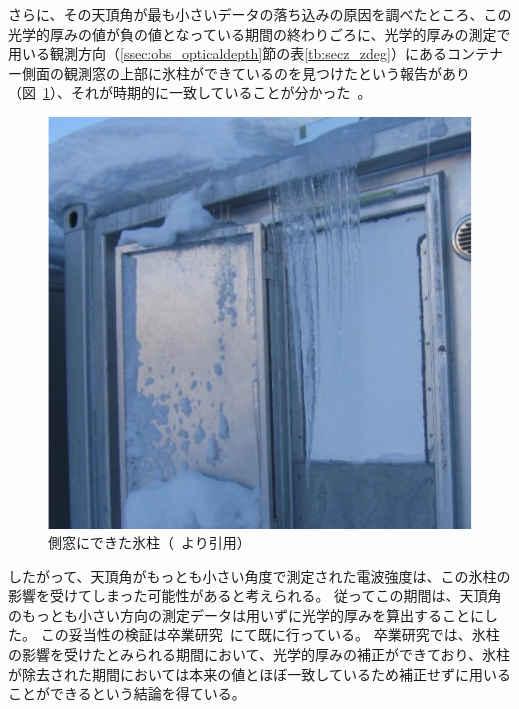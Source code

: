 さらに、その天頂角が最も小さいデータの落ち込みの原因を調べたところ、この光学的厚みの値が負の値となっている期間の終わりごろに、光学的厚みの測定で用いる観測方向（\ref{ssec:obs_opticaldepth}節の表\ref{tb:secz_zdeg}）にあるコンテナー側面の観測窓の上部に氷柱ができているのを見つけたという報告があり（図~\ref{fig:icicles}）、それが時期的に一致していることが分かった~\cite{goto2021bachelor}。
\begin{figure}[htbp]
    \centering
    \includegraphics[width=\linewidth]{master_thesis_contents/master_thesis_fig/icicles.pdf}
    \caption{側窓にできた氷柱（~\cite{goto2021bachelor}より引用）}
    \label{fig:icicles}
\end{figure}
したがって、天頂角がもっとも小さい角度で測定された電波強度は、この氷柱の影響を受けてしまった可能性があると考えられる。
従ってこの期間は、天頂角のもっとも小さい方向の測定データは用いずに光学的厚みを算出することにした。
この妥当性の検証は卒業研究~\cite{goto2021bachelor}にて既に行っている。
卒業研究では、氷柱の影響を受けたとみられる期間において、光学的厚みの補正ができており、氷柱が除去された期間においては本来の値とほぼ一致しているため補正せずに用いることができるという結論を得ている。


